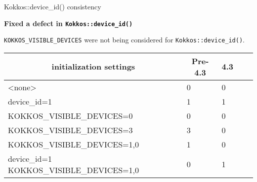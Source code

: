 \begin{frame}[fragile]{Kokkos::device\_id() consistency}

\textbf{Fixed a defect in \texttt{Kokkos::device\_id()}}
\bigskip

\texttt{KOKKOS\_VISIBLE\_DEVICES} were not being considered for \texttt{Kokkos::device\_id()}.
\vspace{10pt}

\begin{table}[]
\begin{tabular}{l|llll}
\multicolumn{1}{c|}{\textbf{initialization settings}} & \multicolumn{1}{c}{\textbf{Pre-4.3}} & \multicolumn{1}{c}{\textbf{4.3}} &  &  \\ \hline
\textless{}none\textgreater{}                         & 0                                    & 0                                &  &  \\
device\_id=1                                          & 1                                    & 1                                &  &  \\
KOKKOS\_VISIBLE\_DEVICES=0                            & 0                                    & 0                                &  &  \\
KOKKOS\_VISIBLE\_DEVICES=3                            & 3                                    & 0                                &  &  \\
KOKKOS\_VISIBLE\_DEVICES=1,0                          & 1                                    & 0                                &  &  \\
device\_id=1 KOKKOS\_VISIBLE\_DEVICES=1,0             & 0                                    & 1                                &  & 
\end{tabular}
\end{table}

\end{frame}

